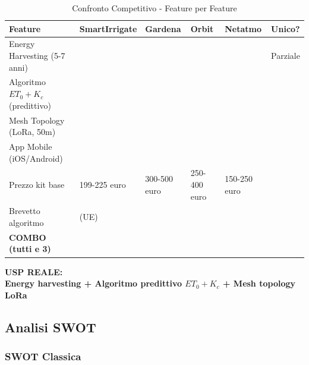 \documentclass[11pt,a4paper]{report}
\newcommand{\checkmarkbold}{\textbf{\checkmark}}
\newcommand{\crossbold}{\textbf{\texttimes}}
\begin{document}
\begin{table}[H]
\centering
\caption{Confronto Competitivo - Feature per Feature}
\label{tab:competitive-comparison}
\begin{tabular}{L{3cm} C{1.2cm} C{1.2cm} C{1.2cm} C{1.2cm} C{1.2cm}}
\toprule
{\bf Feature} & {\bf SmartIrrigate} & {\bf Gardena} & {\bf Orbit} & {\bf Netatmo} & {\bf Unico?} \\
\midrule
Energy Harvesting (5-7 anni) & \checkmarkbold & \crossbold & \crossbold & \checkmarkbold & Parziale \\
Algoritmo $ET_0 + K_c$ (predittivo) & \checkmarkbold & \crossbold & \crossbold & \crossbold & {\bf \checkmarkbold} \\
Mesh Topology (LoRa, 50m) & \checkmarkbold & \crossbold & \crossbold & \crossbold & {\bf \checkmarkbold} \\
App Mobile (iOS/Android) & \checkmarkbold & \checkmarkbold & \checkmarkbold & \checkmarkbold & \crossbold \\
Prezzo kit base & 199-225 euro & 300-500 euro & 250-400 euro & 150-250 euro & {\bf \checkmarkbold} \\
Brevetto algoritmo & \checkmarkbold (UE) & \crossbold & \crossbold & \crossbold & {\bf \checkmarkbold} \\
\midrule
{\bf COMBO (tutti e 3)} & {\bf \checkmarkbold \checkmarkbold \checkmarkbold} & \crossbold & \crossbold & \crossbold & {\bf \checkmarkbold \checkmarkbold \checkmarkbold} \\
\bottomrule
\end{tabular}
\end{table}

\begin{center}
{\bf USP REALE:} \\
{\large \textbf{Energy harvesting + Algoritmo predittivo $ET_0 + K_c$ + Mesh topology LoRa}}
\end{center}

\subsection{Analisi SWOT}
\subsubsection{SWOT Classica}
\end{document}
